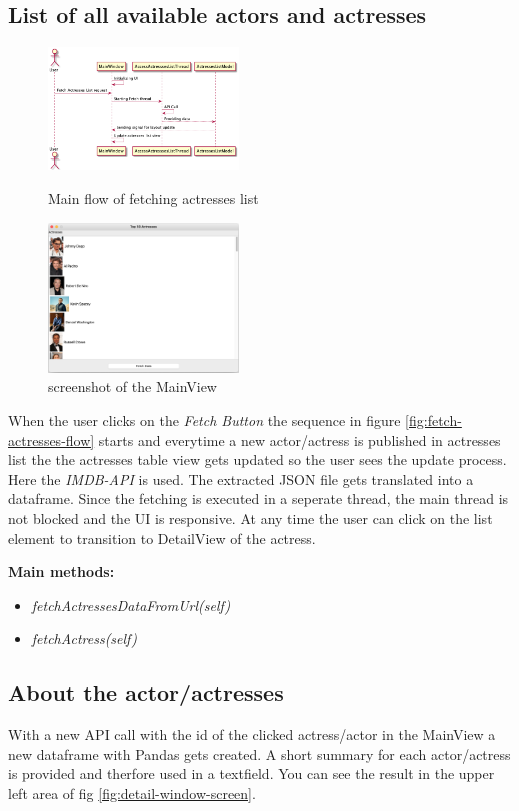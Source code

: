 \documentclass[12pt]{article}
\begin{document}
\subsection{List of all available actors and actresses} \label{list-actors}
\begin{figure}[h]
      \centering
      \includegraphics[width=0.45\textwidth]{img/fetch_actresses_flow.png}
      \caption[width=0.45\textwidth]{\label{fig:fetch-actresses-flow} Main flow of fetching actresses list}
      \includegraphics[width=0.45\textwidth]{img/main-window-screen.png}
      \caption[width=0.45\textwidth]{\label{fig:main-window-screen} screenshot of the MainView}
\end{figure}

When the user clicks on the \textit{Fetch Button} the sequence in figure \ref{fig:fetch-actresses-flow} starts
and everytime a new actor/actress is published in actresses list the the actresses table view gets 
updated so the user sees the update process. Here the \textit{IMDB-API} is used. The extracted JSON file gets translated into a dataframe. Since the fetching is executed in a seperate thread, the 
main thread is not blocked and the UI is responsive. At any time the user can click on the list element
to transition to DetailView of the actress.

\textbf{Main methods:} 
\begin{itemize}
      \item \textit{fetchActressesDataFromUrl(self)}
      \item \textit{fetchActress(self)}
\end{itemize}


\subsection{About the actor/actresses} \label{about}
With a new API call with the id of the clicked actress/actor in the MainView 
a new dataframe with Pandas gets created. A short summary for each actor/actress is provided and
therfore used in a textfield. You can see the result in the upper left area of 
fig \ref{fig:detail-window-screen}.
\end{document}
